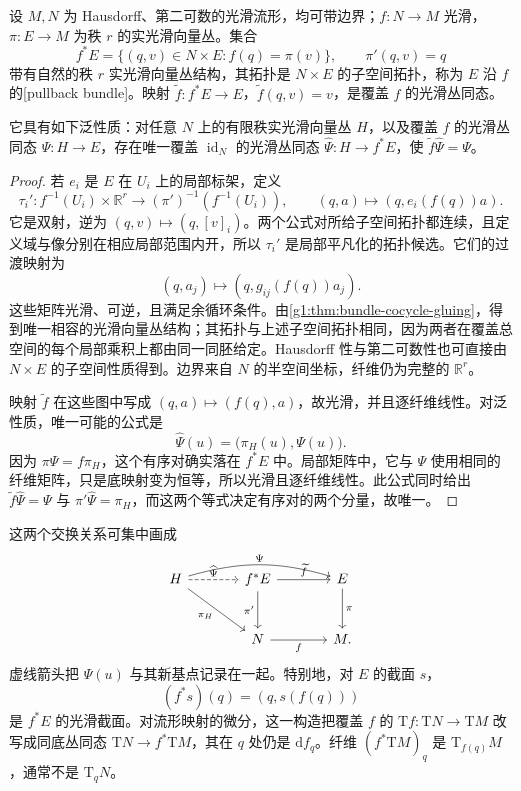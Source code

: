 \begin{proposition}
	\label{g1:prop:pullback-bundle}
	设 \(M,N\) 为 Hausdorff、第二可数的光滑流形，均可带边界；\(f:N\to M\) 光滑，\(\pi:E\to M\) 为秩 \(r\) 的实光滑向量丛。集合
	\[
		f^*E=\{(q,v)\in N\times E:f(q)=\pi(v)\},\qquad
		\pi'(q,v)=q
	\]
	带有自然的秩 \(r\) 实光滑向量丛结构，其拓扑是 \(N\times E\) 的子空间拓扑，称为 \(E\) 沿 \(f\) 的[pullback bundle]。映射 \(\widetilde f:f^*E\to E\)，\(\widetilde f(q,v)=v\)，是覆盖 \(f\) 的光滑丛同态。

	它具有如下泛性质：对任意 \(N\) 上的有限秩实光滑向量丛 \(H\)，以及覆盖 \(f\) 的光滑丛同态 \(\Psi:H\to E\)，存在唯一覆盖 \(\operatorname{id}_N\) 的光滑丛同态 \(\widehat\Psi:H\to f^*E\)，使 \(\widetilde f\widehat\Psi=\Psi\)。
\end{proposition}
\begin{proof}
	若 \(e_i\) 是 \(E\) 在 \(U_i\) 上的局部标架，定义
	\[
		\tau_i':f^{-1}(U_i)\times\mathbb R^r\longrightarrow(\pi')^{-1}(f^{-1}(U_i)),\qquad
		(q,a)\longmapsto(q,e_i(f(q))a).
	\]
	它是双射，逆为 \((q,v)\mapsto(q,[v]_i)\)。两个公式对所给子空间拓扑都连续，且定义域与像分别在相应局部范围内开，所以 \(\tau_i'\) 是局部平凡化的拓扑候选。它们的过渡映射为
	\[
		(q,a_j)\longmapsto(q,g_{ij}(f(q))a_j).
	\]
	这些矩阵光滑、可逆，且满足余循环条件。由\cref{g1:thm:bundle-cocycle-gluing}，得到唯一相容的光滑向量丛结构；其拓扑与上述子空间拓扑相同，因为两者在覆盖总空间的每个局部乘积上都由同一同胚给定。Hausdorff 性与第二可数性也可直接由 \(N\times E\) 的子空间性质得到。边界来自 \(N\) 的半空间坐标，纤维仍为完整的 \(\mathbb R^r\)。

	映射 \(\widetilde f\) 在这些图中写成 \((q,a)\mapsto(f(q),a)\)，故光滑，并且逐纤维线性。对泛性质，唯一可能的公式是
	\[
		\widehat\Psi(u)=\bigl(\pi_H(u),\Psi(u)\bigr).
	\]
	因为 \(\pi\Psi=f\pi_H\)，这个有序对确实落在 \(f^*E\) 中。局部矩阵中，它与 \(\Psi\) 使用相同的纤维矩阵，只是底映射变为恒等，所以光滑且逐纤维线性。此公式同时给出 \(\widetilde f\widehat\Psi=\Psi\) 与 \(\pi'\widehat\Psi=\pi_H\)，而这两个等式决定有序对的两个分量，故唯一。
\end{proof}

这两个交换关系可集中画成
\[
	\begin{tikzcd}[column sep=large,row sep=large]
		H \arrow[rr,bend left=16,"\Psi"] \arrow[dr,"\pi_H"'] \arrow[r,dashed,"\widehat\Psi"] & f^*E \arrow[r,"\widetilde f"] \arrow[d,"\pi'"'] & E \arrow[d,"\pi"] \\
		& N \arrow[r,"f"'] & M.
	\end{tikzcd}
\]
虚线箭头把 \(\Psi(u)\) 与其新基点记录在一起。特别地，对 \(E\) 的截面 \(s\)，
\[
	(f^*s)(q)=(q,s(f(q)))
\]
是 \(f^*E\) 的光滑截面。对流形映射的微分，这一构造把覆盖 \(f\) 的 \(\mathrm{T}f:\mathrm{T}N\to \mathrm{T}M\) 改写成同底丛同态 \(\mathrm{T}N\to f^*\mathrm{T}M\)，其在 \(q\) 处仍是 \(\mathrm{d}f_q\)。纤维 \((f^*\mathrm{T}M)_q\) 是 \(\mathrm{T}_{f(q)}M\)，通常不是 \(\mathrm{T}_qN\)。

